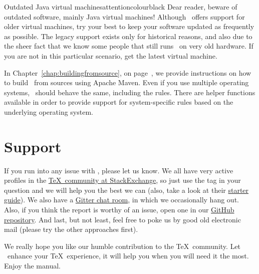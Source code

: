\begin{messagebox}{Outdated Java virtual machines}{attentioncolour}{\icerror}{black}
Dear reader, beware of outdated software, mainly Java virtual machines! Although \arara\ offers support for older virtual machines, try your best to keep your software updated as frequently as possible. The legacy support exists only for historical reasons, and also due to the sheer fact that we know some people that still runs \arara\ on very old hardware. If you are not in this particular scenario, get the latest virtual machine.
\end{messagebox}

In Chapter~\ref{chap:buildingfromsource}, on page~\pageref{chap:buildingfromsource}, we provide instructions on how to build \arara\ from sources using Apache Maven. Even if you use multiple operating systems, \arara\ should behave the same, including the rules. There are helper functions available in order to provide support for system-specific rules based on the underlying operating system.

\section{Support}
\label{sec:support}

If you run into any issue with \arara, please let us know. We all have very active profiles in the \href{https://tex.stackexchange.com/}{\TeX\ community at StackExchange}, so just use the  tag in your question and we will help you the best we can (also, take a look at their \href{https://tex.meta.stackexchange.com/q/1436}{starter guide}).  We also have a \href{https://gitter.im/cereda/arara}{Gitter chat room}, in which we occasionally hang out. Also, if you think the report is worthy of an issue, open one in our \href{https://github.com/cereda/arara/issues}{GitHub repository}. And last, but not least, feel free to poke us by good old electronic mail (please try the other approaches first).

We really hope you like our humble contribution to the \TeX\ community. Let \arara\ enhance your \TeX\ experience, it will help you when you will need it the most. Enjoy the manual.
